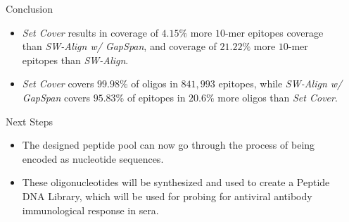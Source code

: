 \documentclass[final]{beamer}
\newlength{\sepwidth}
\newlength{\colwidth}
\newcommand{\separatorcolumn}{\begin{column}{\sepwidth}\end{column}}
\begin{document}
\begin{frame}[t]
\begin{columns}[t]
\begin{column}{\colwidth}
  \begin{block}{Conclusion}
    \begin{itemize}
    \item \emph{Set Cover} results in coverage of $4.15\%$ more $10$-mer epitopes coverage than \emph{SW-Align w/ GapSpan}, and
           coverage of $21.22\%$ more $10$-mer epitopes than \emph{SW-Align}.
         \item \emph{Set Cover} covers $99.98\%$ of oligos in $841,993$ epitopes, while \emph{SW-Align w/ GapSpan} covers $95.83\%$ of epitopes in
           $20.6\%$ more oligos than \emph{Set Cover}.
    \end{itemize}

    \begin{block}{Next Steps}
      \begin{itemize}
      \item The designed peptide pool can now go through the process of being encoded as nucleotide sequences.
      \item These oligonucleotides will be synthesized and used to create a Peptide DNA Library, which
            will be used for probing for antiviral antibody immunological response in sera. 
      \end{itemize}
    \end{block}
  \end{block}
\end{column}

\separatorcolumn
\end{columns}
\end{frame}
\end{document}
